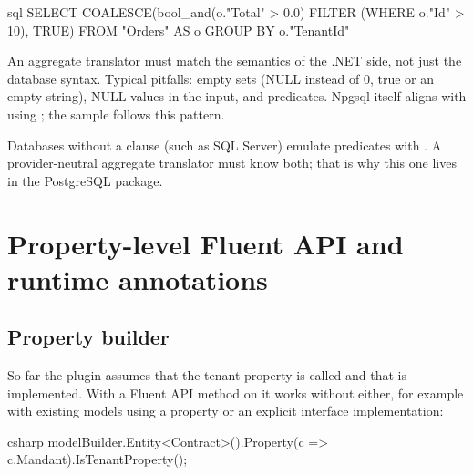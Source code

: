 \begin{sourcecode}[Generated SQL for g.\allowbreak{}Where(\allowbreak{}o => o.\allowbreak{}Id > 10).\allowbreak{}Select(\allowbreak{}o => o.\allowbreak{}Total > 0)]{sql}
SELECT COALESCE(bool_and(o."Total" > 0.0) FILTER (WHERE o."Id" > 10), TRUE)
FROM "Orders" AS o
GROUP BY o."TenantId"
\end{sourcecode}

\begin{important}
  An aggregate translator must match the semantics of the .NET side, not just the database
  syntax. Typical pitfalls: empty sets (NULL instead of 0, true or an empty string), NULL
  values in the input, and predicates. Npgsql itself aligns 
  with  using ; the sample follows this
  pattern.
\end{important}

Databases without a  clause (such as SQL Server) emulate predicates with
. A provider-neutral aggregate translator must know
both; that is why this one lives in the PostgreSQL package.

\chapter{Property-level Fluent API and runtime annotations}\label{ch:property-level-fluent-api-and}

\section{Property builder}

So far the plugin assumes that the tenant property is called 
and that  is implemented. With a Fluent API method on
 it works without either, for example with existing
models using a property  or an explicit interface
implementation:

\begin{sourcecode}[Usage]{csharp}
modelBuilder.Entity<Contract>().Property(c => c.Mandant).IsTenantProperty();
\end{sourcecode}

